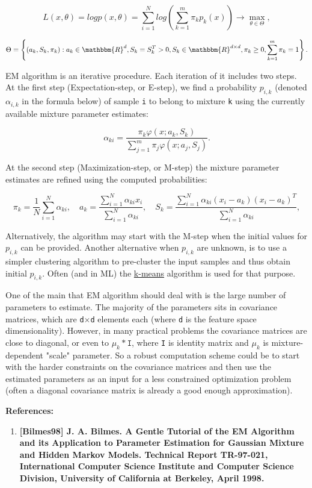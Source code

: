 \[
L(x,\theta)=logp(x,\theta)=\sum_{i=1}^{N}log\left(\sum_{k=1}^{m}\pi_kp_k(x)\right)\to\max_{\theta\in\Theta},
\]

\[
\Theta=\left\{(a_k,S_k,\pi_k): a_k \in \mathbbm{R} ^d,S_k=S_k^T>0,S_k \in \mathbbm{R} ^{d \times d},\pi_k\geq 0,\sum_{k=1}^{m}\pi_k=1\right\}.
\]

EM algorithm is an iterative procedure. Each iteration of it includes
two steps. At the first step (Expectation-step, or E-step), we find a
probability $p_{i,k}$ (denoted $\alpha_{i,k}$ in the formula below) of
sample \texttt{i} to belong to mixture \texttt{k} using the currently
available mixture parameter estimates:

\[
\alpha_{ki} = \frac{\pi_k\varphi(x;a_k,S_k)}{\sum\limits_{j=1}^{m}\pi_j\varphi(x;a_j,S_j)}.
\]

At the second step (Maximization-step, or M-step) the mixture parameter estimates are refined using the computed probabilities:

\[
\pi_k=\frac{1}{N}\sum_{i=1}^{N}\alpha_{ki}, \quad a_k=\frac{\sum\limits_{i=1}^{N}\alpha_{ki}x_i}{\sum\limits_{i=1}^{N}\alpha_{ki}}, \quad S_k=\frac{\sum\limits_{i=1}^{N}\alpha_{ki}(x_i-a_k)(x_i-a_k)^T}{\sum\limits_{i=1}^{N}\alpha_{ki}},
\]

Alternatively, the algorithm may start with the M-step when the initial values for $p_{i,k}$ can be provided. Another alternative when $p_{i,k}$ are unknown, is to use a simpler clustering algorithm to pre-cluster the input samples and thus obtain initial $p_{i,k}$. Often (and in ML) the \href{CxCore#KMeans2}{k-means} algorithm is used for that purpose.

One of the main that EM algorithm should deal with is the large number of parameters to estimate. The majority of the parameters sits in covariance matrices, which are \texttt{d$\times$d} elements each (where \texttt{d} is the feature space dimensionality). However, in many practical problems the covariance matrices are close to diagonal, or even to $\mu_k*\texttt{I}$, where \texttt{I} is identity matrix and $\mu_k$ is mixture-dependent "scale" parameter. So a robust computation scheme could be to start with the harder constraints on the covariance matrices and then use the estimated parameters as an input for a less constrained optimization problem (often a diagonal covariance matrix is already a good enough approximation).

\textbf{References:}
\begin{enumerate}
\item{\textbf{[Bilmes98] J. A. Bilmes. A Gentle Tutorial of the EM Algorithm and its Application to Parameter Estimation for Gaussian Mixture and Hidden Markov Models. Technical Report TR-97-021, International Computer Science Institute and Computer Science Division, University of California at Berkeley, April 1998.}}
\end{enumerate}


